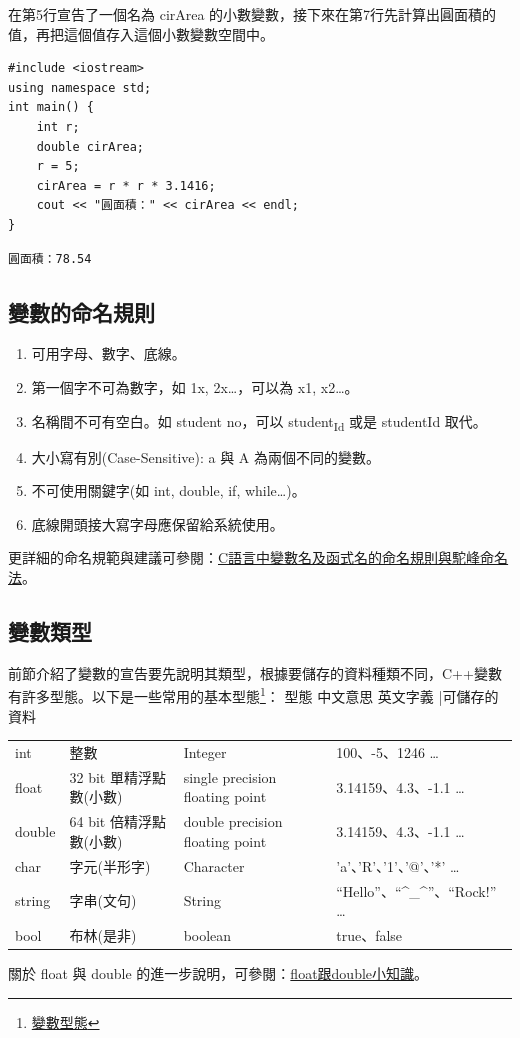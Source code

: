\documentclass[12pt,a4paper]{article}
\begin{document}
在第5行宣告了一個名為 cirArea 的小數變數，接下來在第7行先計算出圓面積的值，再把這個值存入這個小數變數空間中。
\lstset{breaklines=true,language=C++,label= ,caption= ,captionpos=b,firstnumber=1,numbers=left}
\begin{lstlisting}
#include <iostream>
using namespace std;
int main() {
    int r;
    double cirArea;
    r = 5;
    cirArea = r * r * 3.1416;
    cout << "圓面積：" << cirArea << endl;
}
\end{lstlisting}

\begin{verbatim}
圓面積：78.54
\end{verbatim}

\subsection{變數的命名規則}
\label{sec:org145a7bc}
\begin{enumerate}
\item 可用字母、數字、底線。
\item 第一個字不可為數字，如 1x, 2x\ldots{}，可以為 x1, x2\ldots{}。
\item 名稱間不可有空白。如 student no，可以 student\textsubscript{Id} 或是 studentId 取代。
\item 大小寫有別(Case-Sensitive): a 與 A 為兩個不同的變數。
\item 不可使用關鍵字(如 int, double, if, while\ldots{})。
\item 底線開頭接大寫字母應保留給系統使用。
\end{enumerate}
更詳細的命名規範與建議可參閱：\href{https://www.itread01.com/content/1541214186.html}{C語言中變數名及函式名的命名規則與駝峰命名法}。

\subsection{變數類型}
\label{cpp_variable_types}
前節介紹了變數的宣告要先說明其類型，根據要儲存的資料種類不同，C++變數有許多型態。以下是一些常用的基本型態\footnote{\href{https://www.csie.ntu.edu.tw/\~b98902112/cpp\_and\_algo/cpp/variable\_type\_and\_declare.html}{變數型態}}：
型態 	中文意思 	英文字義 |可儲存的資料
\begin{center}
\begin{tabular}{llll}
int & 整數 & Integer & 100、-5、1246 \ldots{}\\
float & 32 bit 單精浮點數(小數) & single precision floating point & 3.14159、4.3、-1.1 \ldots{}\\
double & 64 bit 倍精浮點數(小數) & double precision floating point & 3.14159、4.3、-1.1 \ldots{}\\
char & 字元(半形字) & Character & 'a'、'R'、'1'、'@'、'*' \ldots{}\\
string & 字串(文句) & String & ``Hello''、``\^{}\_\^{}''、``Rock!'' \ldots{}\\
bool & 布林(是非) & boolean & true、false\\
\end{tabular}
\end{center}
關於 float 與 double 的進一步說明，可參閱：\href{https://taichunmin.pixnet.net/blog/post/27827769}{float跟double小知識}。
\end{document}

